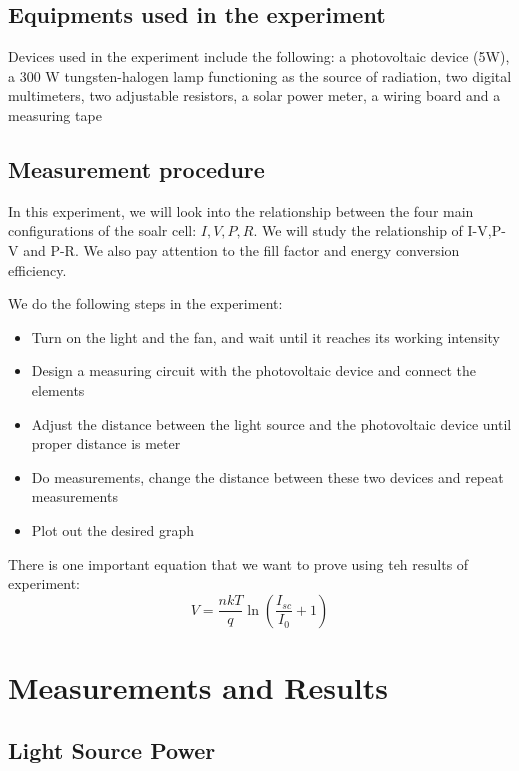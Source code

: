 \documentclass[12pt, a4paper, oneside]{article}
\begin{document}
\subsection{Equipments used in the experiment}
\indent

Devices used in the experiment include the following: a photovoltaic device (5W), a 300 W tungsten-halogen lamp functioning as 
the source of radiation, two digital multimeters, two adjustable resistors, 
a solar power meter, a wiring board and a measuring tape

\subsection{Measurement procedure}
\indent

In this experiment, we will look into the relationship between the four main configurations of the soalr cell:
$I,V,P,R$. We will study the relationship of I-V,P-V and P-R. We also pay attention to the fill factor and energy conversion efficiency.

We do the following steps in the experiment:
\begin{itemize}
	\item Turn on the light and the fan, and wait until it reaches its working intensity
	\item Design a measuring circuit with the photovoltaic device and connect the elements
	\item Adjust the distance between the light source and the photovoltaic device until proper distance is meter
	\item Do measurements, change the distance between these two devices and repeat measurements
	\item Plot out the desired graph
\end{itemize}

There is one important equation that we want to prove using teh results of experiment:
\begin{equation*}
	V = \frac{n k T}{q} \ln\left(\frac{I_{sc}}{I_0} + 1\right)
\end{equation*}

\section{Measurements and Results}
\subsection{Light Source Power}
\indent
\end{document}
